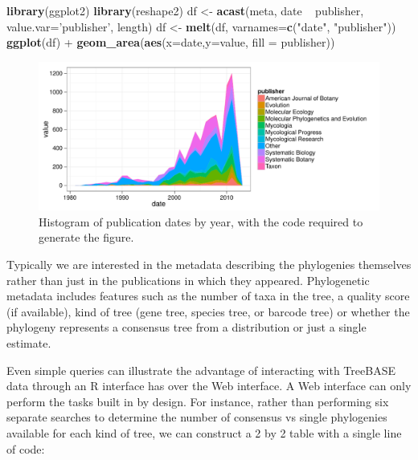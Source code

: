 \documentclass[author-year, 8pt, 3p]{elsarticle} %
\newenvironment{Shaded}{}{}
\newcommand{\KeywordTok}[1]{\textcolor[rgb]{0.00,0.44,0.13}{\textbf{{#1}}}}
\newcommand{\DataTypeTok}[1]{\textcolor[rgb]{0.56,0.13,0.00}{{#1}}}
\newcommand{\StringTok}[1]{\textcolor[rgb]{0.25,0.44,0.63}{{#1}}}
\newcommand{\NormalTok}[1]{{#1}}
\begin{document}
\begin{Shaded}
\begin{Highlighting}[]
\KeywordTok{library}\NormalTok{(ggplot2) }
\KeywordTok{library}\NormalTok{(reshape2)}
\NormalTok{df <- }\KeywordTok{acast}\NormalTok{(meta, date ~ publisher, }\DataTypeTok{value.var=}\StringTok{'publisher'}\NormalTok{, length)}
\NormalTok{df <- }\KeywordTok{melt}\NormalTok{(df, }\DataTypeTok{varnames=}\KeywordTok{c}\NormalTok{(}\StringTok{"date"}\NormalTok{, }\StringTok{"publisher"}\NormalTok{))}
\KeywordTok{ggplot}\NormalTok{(df) + }\KeywordTok{geom_area}\NormalTok{(}\KeywordTok{aes}\NormalTok{(}\DataTypeTok{x=}\NormalTok{date,}\DataTypeTok{y=}\NormalTok{value, }\DataTypeTok{fill =} \NormalTok{publisher)) }
\end{Highlighting}
\end{Shaded}
\begin{figure}[htbp]
\centering
\includegraphics{figure1.pdf}
\caption{Histogram of publication dates by year, with the code required
to generate the figure.}
\end{figure}

Typically we are interested in the metadata describing the phylogenies
themselves rather than just in the publications in which they appeared.
Phylogenetic metadata includes features such as the number of taxa in
the tree, a quality score (if available), kind of tree (gene tree,
species tree, or barcode tree) or whether the phylogeny represents a
consensus tree from a distribution or just a single estimate.

Even simple queries can illustrate the advantage of interacting with
TreeBASE data through an R interface has over the Web interface. A Web
interface can only perform the tasks built in by design. For instance,
rather than performing six separate searches to determine the number of
consensus vs single phylogenies available for each kind of tree, we can
construct a 2 by 2 table with a single line of code:
\end{document}
